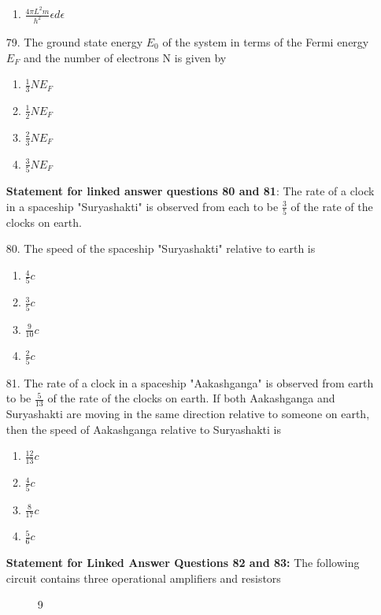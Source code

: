 \documentclass[journal]{IEEEtran}
\begin{document}
\begin{enumerate}
\begin{enumerate}[label=(\Alph*)]
        \item  $\frac{4\pi L^2 m}{h^2}\epsilon d\epsilon$
    \end{enumerate}
    \item[79.]  The ground state energy $E_0$ of the system in terms of the Fermi energy $E_F$ and the number of electrons N is given by
    \begin{enumerate}[label=(\Alph*)]
        \item $\frac{1}{3}NE_F$
        \item $\frac{1}{2}NE_F$
        \item $\frac{2}{3}NE_F$
        \item $\frac{3}{5}NE_F$
    \end{enumerate}
    \textbf{Statement for linked answer questions 80 and 81}:
    The rate of a clock in a spaceship "Suryashakti" is observed from each to be $\frac{3}{5}$ of the rate of the clocks on earth.
    \item[80.]  The speed of the spaceship "Suryashakti" relative to earth is
    \begin{enumerate}[label=(\Alph*)]
        \item $\frac{4}{5}c$
        \item $\frac{3}{5}c$
        \item $\frac{9}{10}c$
        \item $\frac{2}{5}c$
    \end{enumerate}
    \item[81.] The rate of a clock in a spaceship "Aakashganga" is observed from earth to be $\frac{5}{13}$ of the rate of the clocks on earth. If both Aakashganga and Suryashakti are moving in the same direction relative to someone on earth, then the speed of Aakashganga relative to Suryashakti is
    \begin{enumerate}[label=(\Alph*)]
        \item $\frac{12}{13}c$
        \item $\frac{4}{5}c$
        \item $\frac{8}{17}c$
        \item $\frac{5}{6}c$
    \end{enumerate}
    \textbf{Statement for Linked Answer Questions 82 and 83:}
    The following circuit contains three operational amplifiers and resistors
    \begin{figure}[!ht]
      \centering
      \caption{9}  %
      \label{fig9}  %
  \end{figure}
  

\end{enumerate}
\end{document}
